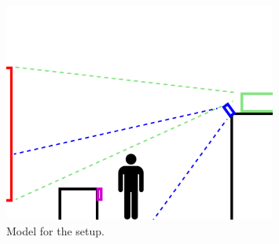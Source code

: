 \begin{figure}[htbp] 
\centering 
\includegraphics[width=0.8\textwidth]{Pictures/Setup/sideview_camera_with_person.png} 
\caption{Model for the setup.} 
\label{fig:setup_model_person} 
\end{figure}

